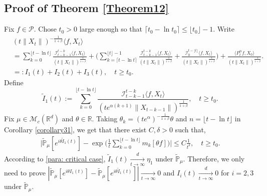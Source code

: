 \documentclass[12pt]{amsart}
\theoremstyle{plain}
\theoremstyle{definition}
\numberwithin{equation}{section}
\begin{document}
\subsection{Proof of Theorem \ref{Theorem12}}
\label{sec: proof of thm 1.3}
    Fix $f\in\mathcal{P}$. 
    Chose $t_0 > 0$ large enough so that $\lceil t_0-\ln t_0\rceil \leq \lfloor t_0 \rfloor - 1.$
    Write
    \begin{align*}
        &(t\|X_t\|)^{-\frac{1}{1+\beta}}\langle f,X_t\rangle
        \\ &=\sum_{k=0}^{\lfloor t-\ln t \rfloor} \frac{\mathcal I_{t-k-1}^{t-k}\langle f ,X_t\rangle}{(t\|X_t\|)^{\frac{1}{1+\beta}}}+\Big(\sum_{k=\lceil t-\ln t \rceil}^{\lfloor t \rfloor-1} \frac{\mathcal I_{t-k-1}^{t-k}\langle f ,X_t\rangle}{(t\|X_t\|)^{\frac{1}{1+\beta}}}+\frac{\mathcal I_0^{t-\lfloor t \rfloor}\langle f ,X_t\rangle}{(t\|X_t\|)^{\frac{1}{1+\beta}}}\Big) + \frac{\langle P^\alpha_tf,X_0\rangle}{(t\|X_t\|)^{\frac{1}{1+\beta}}}.
        \\&=:I_1(t)+I_2(t) + I_3(t), 
        \quad t\geq t_0.
    \end{align*}
    Define
\[
    \tilde I_1(t)
    :=\sum_{k=0}^{\lfloor t-\ln t \rfloor}\frac{\mathcal I_{t-k-1}^{t-k}\langle f ,X_t\rangle}{(t e^{\alpha(k+1)}\|X_{t-k-1}\|)^{\frac{1}{1+\beta}}}, 
    \quad t\geq t_0.
\]
    Fix $\mu \in \mathcal M_c(\mathbb R^d)$ and $\theta\in \mathbb{R}$. Taking $\theta_k=(t e^{\alpha})^{-\frac{1}{1+\beta}} \theta $ and $n={\lfloor t-\ln t \rfloor}$ in Corollary \ref{corollary31}, we get that there exist $C,\delta>0$ such that,
\begin{align*}
        \Big|\mathbb{\tilde{P}}_{\mu} [e^{i\theta\tilde{I}_1(t)}]-\exp\Big(\frac{1}{t}\sum_{k=0}^{\lfloor t-\ln t \rfloor}m_k[\theta f]\Big)\Big|\leq C \frac{1}{t^{\delta}},
        \quad t\geq t_0.
\end{align*}
    According to \eqref{para: critical case},  $\tilde{I}_1(t)\xrightarrow[t\to \infty]{d}\eta_1$ under $\tilde {\mathbb P}_\mu$.
    Therefore, we only need to prove $|\mathbb{\tilde{P}}_{\mu}[e^{i\theta I_1(t)}]-\mathbb{\tilde{P}}_{\mu}[e^{i\theta\tilde{I}_1(t)}]|\xrightarrow[t\to \infty]{} 0$ and $I_i(t)\xrightarrow[t\to \infty]{d} 0$ for $i = 2,3$ under $\tilde {\mathbb P}_\mu$.
\end{document}
